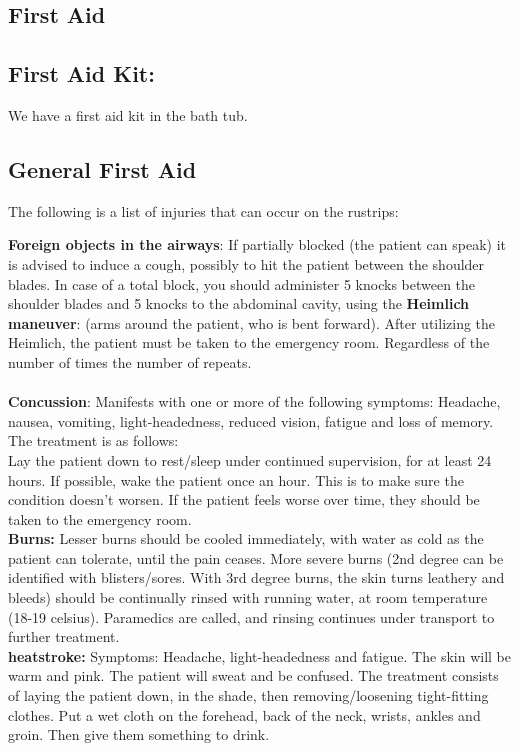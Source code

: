 \documentclass[../../../main.tex]{subfiles}
\begin{document}
\begin{multicols}{2}
\section{First Aid}
\subsection{First Aid Kit:}
We have a first aid kit in the bath tub.


\subsection{General First Aid}
The following is a list of injuries that can occur on the rustrips:

\textbf{Foreign objects in the airways}: If partially blocked (the patient can speak) it is advised to induce a cough, possibly to hit the patient between the shoulder blades. In case of a total block, you should administer 5 knocks between the shoulder blades and 5 knocks to the abdominal cavity, using the \textbf{Heimlich maneuver}: (arms around the patient, who is bent forward). After utilizing the Heimlich, the patient must be taken to the emergency room. Regardless of the number of times the number of repeats.
\\\\
\textbf{Concussion}: Manifests with one or more of the following symptoms: Headache, nausea, vomiting, light-headedness, reduced vision, fatigue and loss of memory. \\
The treatment is as follows:\\
Lay the patient down to rest/sleep under continued supervision, for at least 24 hours. If possible, wake the patient once an hour. This is to make sure the condition doesn't worsen. If the patient feels worse over time, they should be taken to the emergency room.    
\\

\textbf{Burns:} Lesser burns should be cooled immediately, with water as cold as the patient can tolerate, until the pain ceases. More severe burns (2nd degree can be identified with blisters/sores. With 3rd degree burns, the skin turns leathery and bleeds) should be continually rinsed with running water, at room temperature (18-19 celsius). Paramedics are called, and rinsing continues under transport to further treatment.
\\

\textbf{heatstroke:} Symptoms: Headache, light-headedness and fatigue. The skin will be warm and pink. The patient will sweat and be confused. The treatment consists of laying the patient down, in the shade, then removing/loosening tight-fitting clothes. Put a wet cloth on the forehead, back of the neck, wrists, ankles and groin. Then give them something to drink.
\\


\end{multicols}
\end{document}
